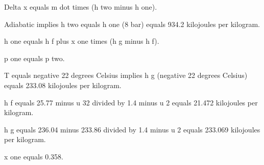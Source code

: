 Delta x equals m dot times (h two minus h one).  

Adiabatic implies h two equals h one (8 bar) equals 934.2 kilojoules per kilogram.  

h one equals h f plus x one times (h g minus h f).  

p one equals p two.  

T equals negative 22 degrees Celsius implies h g (negative 22 degrees Celsius) equals 233.08 kilojoules per kilogram.  

h f equals 25.77 minus u 32 divided by 1.4 minus u 2 equals 21.472 kilojoules per kilogram.  

h g equals 236.04 minus 233.86 divided by 1.4 minus u 2 equals 233.069 kilojoules per kilogram.  

x one equals 0.358.